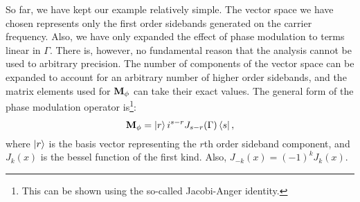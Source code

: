So far, we have kept our example relatively simple. %
The vector space we have chosen represents only the first order sidebands generated on the carrier frequency. %
Also, we have only expanded the effect of phase modulation to terms linear in $\Gamma$. %
There is, however, no fundamental reason that the analysis cannot be used to arbitrary precision. %
The number of components of the vector space can be expanded to account for an arbitrary number of higher order sidebands, and the matrix elements used for $\mathbf{M_\phi}$ can take their exact values. %
The general form of the phase modulation operator is\footnote{This can be shown using the so-called Jacobi-Anger identity.}:
\begin{equation}
\mathbf{M_\phi} = \left| r \right> i^{s-r} J_{s-r}(\Gamma) \left< s \right|,
\end{equation}
where $\left| r \right>$ is the basis vector representing the $r$th order sideband component, and $J_k(x)$ is the bessel function of the first kind. %
Also, $J_{-k}(x)=(-1)^kJ_k(x)$.